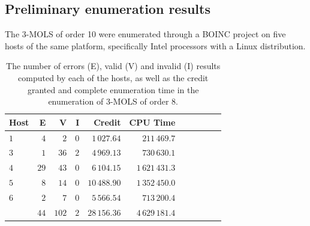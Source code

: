 \subsection{Preliminary enumeration results} \label{5pres}
The 3-MOLS of order 10 were enumerated through a BOINC project on five hosts of the same platform, specifically Intel processors with  a Linux distribution.

\begin{table}
 \centering \vspace{-.2cm}\caption{The number of errors (E), valid (V) and invalid (I) results computed by each of the hosts, as well as the credit granted and complete enumeration time in the enumeration of 3-MOLS of order 8.}\vspace*{-.2cm}
\begin{tabular}{lrrrrrrrrrr}
\toprule
Host & E & V & I & Credit  & CPU Time \\ \midrule
$1$ & $4$ & $2$ & $0$ & $1\,027.64$ & $211\,469.7$ \\
$3$ & $1$ & $36$ & $2$ & $4\,969.13$ & $730\,630.1$ \\
$4$ & $29$ & $43$ & $0$ & $6\,104.15$ & $1\,621\,431.3$ \\
$5$ & $8$ & $14$ & $0$ & $10\,488.90$ & $1\,352\,450.0$ \\
$6$ & $2$ & $7$ & $0$ & $5\,566.54$ & $713\,200.4$ \\ \midrule
  & $44$ & $102$ & $2$ & $28\,156.36$& $4\,629\,181.4$\\
 \bottomrule
\end{tabular}\vspace*{.1cm}
\label{83naivehosts}
\end{table}

%

